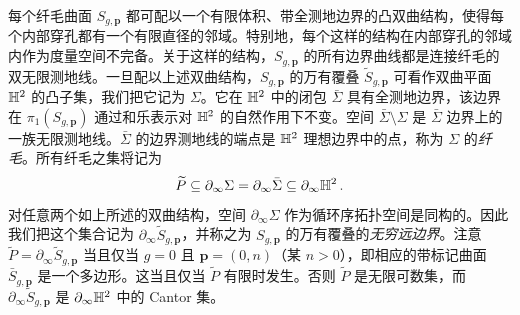 每个纤毛曲面 $S_{g,\mathbf p}$ 都可配以一个有限体积、带全测地边界的凸双曲结构，使得每个内部穿孔都有一个有限直径的邻域。特别地，每个这样的结构在内部穿孔的邻域内作为度量空间不完备。关于这样的结构，$S_{g,\mathbf p}$ 的所有边界曲线都是连接纤毛的双无限测地线。一旦配以上述双曲结构，$S_{g,\mathbf p}$ 的万有覆叠 $\widetilde{S}_{g,\mathbf p}$ 可看作双曲平面 $\mathbb{H}^2$ 的凸子集，我们把它记为 $\Sigma$。它在 $\mathbb{H}^2$ 中的闭包 $\bar\Sigma$ 具有全测地边界，该边界在 $\pi_1(S_{g,\mathbf p})$ 通过和乐表示对 $\mathbb{H}^2$ 的自然作用下不变。空间 $\bar\Sigma\setminus\Sigma$ 是 $\bar\Sigma$ 边界上的一族无限测地线。$\bar\Sigma$ 的边界测地线的端点是 $\mathbb{H}^2$ 理想边界中的点，称为 $\Sigma$ 的\emph{纤毛}。所有纤毛之集将记为
\[
\widetilde{P}\subseteq\partial_\infty\Sigma=\partial_\infty\bar\Sigma\subseteq\partial_\infty\mathbb{H}^2\,.
\]
对任意两个如上所述的双曲结构，空间 $\partial_\infty\Sigma$ 作为循环序拓扑空间是同构的。因此我们把这个集合记为 $\partial_\infty\widetilde{S}_{g,\mathbf p}$，并称之为 $S_{g,\mathbf p}$ 的万有覆叠的\emph{无穷远边界}。注意 $\widetilde{P}=\partial_\infty\widetilde{S}_{g,\mathbf p}$ 当且仅当 $g=0$ 且 $\mathbf p=(0,n)$（某 $n>0$），即相应的带标记曲面 $\bar S_{g,\mathbf p}$ 是一个多边形。这当且仅当 $\widetilde{P}$ 有限时发生。否则 $\widetilde{P}$ 是无限可数集，而 $\partial_\infty\widetilde{S}_{g,\mathbf p}$ 是 $\partial_\infty\mathbb{H}^2$ 中的 Cantor 集。


